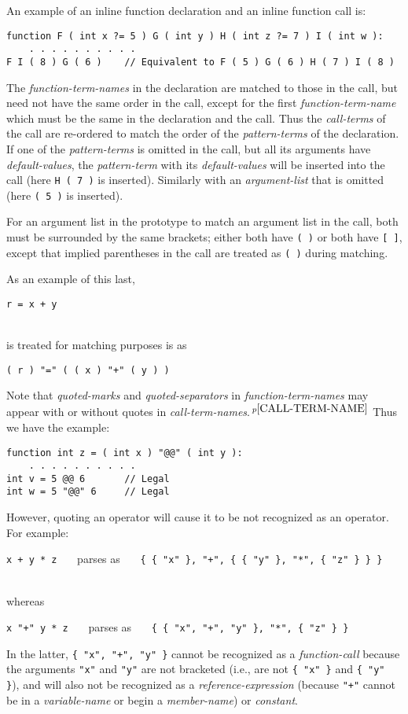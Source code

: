 \documentclass[12pt]{article}
\newcommand{\pagnote}[1]{$\,^{p\pageref{#1}}$}
\newenvironment{indpar}[1][0.3in]%
	{\begin{list}{}%
		     {\setlength{\itemsep}{0in}%
		      \setlength{\topsep}{0in}%
		      \setlength{\parsep}{1ex}%
		      \setlength{\labelwidth}{#1}%
		      \setlength{\leftmargin}{#1}%
		      \addtolength{\leftmargin}{\labelsep}}%
	 \item}%
	{\end{list}}
\begin{document}
An example of an inline function declaration and an inline function call is:
\begin{indpar}\begin{verbatim}
function F ( int x ?= 5 ) G ( int y ) H ( int z ?= 7 ) I ( int w ):
    . . . . . . . . . .
F I ( 8 ) G ( 6 )    // Equivalent to F ( 5 ) G ( 6 ) H ( 7 ) I ( 8 )
\end{verbatim}\end{indpar}

The {\em function-term-names} in the declaration are matched to those
in the call, but need not have the same order in the call, except for
the first {\em function-term-name} which must be the same in the
declaration and the call.  Thus the {\em call-terms} of the call
are re-ordered to match the order of the {\em pattern-terms} of the
declaration.  If one of the {\em pattern-terms} is omitted in the
call, but all its arguments have {\em default-values},
the {\em pattern-term} with its
{\em default-values} will be inserted into the call
(here {\tt H ( 7 )} is inserted).
Similarly with an {\em argument-list} that is omitted
(here {\tt ( 5 )} is inserted).

For an argument
list in the prototype to match an argument list in the call, both
must be surrounded by the same brackets; either both have {\tt (~)}
or both have {\tt [~]}, except that implied parentheses in the
call are treated as {\tt (~)} during matching.

As an example of this last,
\\[0.5ex]
\centerline{
{\tt r = x + y}
}
\\
is treated for matching purposes is as
\\[1ex]
\centerline{
{\tt ( r ) "=" ( ( x ) "+" ( y ) )}
}

Note that {\em quoted-marks} and {\em quoted-separators}
in {\em function-term-names} may appear with or without quotes in
{\em call-term-names}.\pagnote{CALL-TERM-NAME}  Thus we have the example:
\begin{indpar}\begin{verbatim}
function int z = ( int x ) "@@" ( int y ):
    . . . . . . . . . .
int v = 5 @@ 6       // Legal
int w = 5 "@@" 6     // Legal
\end{verbatim}\end{indpar}

However, quoting an operator will cause it to be not recognized as
an operator.  For example:
\\[0.5ex]
\centerline{
{\tt x + y * z}
~~~parses as~~~
{\tt \{ \{ "x" \}, "+", \{ \{ "y" \}, "*", \{ "z" \} \} \}} \\
} \\
whereas \\
\centerline{
{\tt x "+" y * z}
~~~parses as~~~
{\tt \{ \{ "x", "+", "y" \}, "*", \{ "z" \} \}}
}
In the latter, {\tt \{ "x", "+", "y" \}} cannot be recognized as
a {\em function-call} because the arguments {\tt "x"} and {\tt "y"} are
not bracketed (i.e., are not {\tt \{ "x" \}} and {\tt \{ "y" \}}),
and will also not be recognized as a {\em reference-expression}
(because {\tt "+"} cannot be in a {\em variable-name} or
begin a {\em member-name}) or
{\em constant}.
\end{document}
